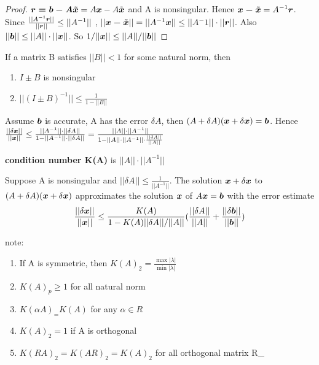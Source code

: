 \documentclass[11pt]{article}
\begin{document}
    \begin{proof}
      $\boldsymbol{r=b-A\tilde{x}}=A\boldsymbol{x}-A\tilde{\boldsymbol{x}}$ and A is nonsingular. Hence 
      $\boldsymbol{x-\tilde{x}}=A^{-1}\boldsymbol{r}$. Since $\frac{||A^{-1}\boldsymbol{r}||}{||\boldsymbol{r}||}\le||A^{-1}||$
      , $||\boldsymbol{x-\tilde{x}}||=||A^{-1}\boldsymbol{x}||\le||A^-1||\cdot||\boldsymbol{r}||$. Also
      $||\boldsymbol{b}||\le||A||\cdot||\boldsymbol{x}||$. So $1/||\boldsymbol{x}||\le||A||/||\boldsymbol{b}||$
    \end{proof}

    \begin{theorem}
      If a matrix B satisfies $||B||<1$ for some natural norm, then
      \begin{enumerate}
      \item $I\pm B$ is nonsingular
      \item $||(I\pm B)^{-1}||\le \frac{1}{1-||B||}$
      \end{enumerate}
    \end{theorem}

    Assume \(\boldsymbol{b}\) is accurate, A has the error \(\delta A\), then
    \((A+\delta A)(\boldsymbol{x}+\delta\boldsymbol{x})=\boldsymbol{b}\). Hence
    \(\frac{||\delta\boldsymbol{x}||}{||\boldsymbol{x}||}\le \frac{||A^{-1}||\cdot||\delta
      A||}{1-||A^{-1}||\cdot||\delta A||}=\frac{||A||\cdot||A^{-1}||}{1
      -||A||\cdot||A^{-1}||\cdot \frac{||\delta A||}{||A||}}\)

    \textbf{condition number K(A)} is \(||A||\cdot||A^{-1}||\)

    \begin{theorem}
      Suppose A is nonsingular and $||\delta A||\le \frac{1}{||A^{-1}||}$. The solution
      $\boldsymbol{x}+\delta\boldsymbol{x}$ to $(A+\delta A)(\boldsymbol{x}+\delta\boldsymbol{x})$ approximates the solution
      $\boldsymbol{x}$ of $A\boldsymbol{x}=\boldsymbol{b}$ with the error estimate
      \begin{equation*}
        \frac{||\delta\boldsymbol{x}||}{||\boldsymbol{x}||}\le \frac{K(A)}{1-K(A)||\delta A||/||A||}
        (\frac{||\delta A||}{||A||}+ \frac{||\delta\boldsymbol{b}||}{||\boldsymbol{b}||})
      \end{equation*}
    \end{theorem}

    note:
    \begin{enumerate}
    \item If A is symmetric, then \(K(A)_2= \frac{\max|\lambda|}{\min|\lambda|}\)
    \item \(K(A)_p\ge1\) for all natural norm
    \item \(K(\alpha A)_=K(A)\) for any \(\alpha\in R\)
    \item \(K(A)_2=1\) if A is orthogonal
    \item \(K(RA)_2=K(AR)_2=K(A)_2\) for all orthogonal matrix R\_
    \end{enumerate}
\end{document}
